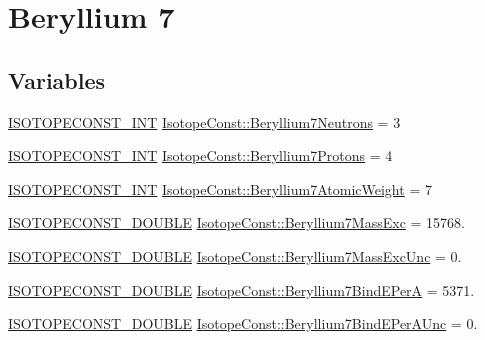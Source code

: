 \hypertarget{group___isotope_const-_beryllium-_be7}{}\section{Beryllium 7}
\label{group___isotope_const-_beryllium-_be7}
\subsection*{Variables}
\begin{DoxyCompactItemize}
\item 
\mbox{\hyperlink{group___isotope_const-_macros_ga5f18360b3e99483a35c32d789e62621c}{I\+S\+O\+T\+O\+P\+E\+C\+O\+N\+S\+T\+\_\+\+I\+NT}} \mbox{\hyperlink{group___isotope_const-_beryllium-_be7_gae3dd52090434b200a4a964110148ff34}{Isotope\+Const\+::\+Beryllium7\+Neutrons}} = 3
\item 
\mbox{\hyperlink{group___isotope_const-_macros_ga5f18360b3e99483a35c32d789e62621c}{I\+S\+O\+T\+O\+P\+E\+C\+O\+N\+S\+T\+\_\+\+I\+NT}} \mbox{\hyperlink{group___isotope_const-_beryllium-_be7_ga08ddc8ad5341c77fc4d43bbd85a62518}{Isotope\+Const\+::\+Beryllium7\+Protons}} = 4
\item 
\mbox{\hyperlink{group___isotope_const-_macros_ga5f18360b3e99483a35c32d789e62621c}{I\+S\+O\+T\+O\+P\+E\+C\+O\+N\+S\+T\+\_\+\+I\+NT}} \mbox{\hyperlink{group___isotope_const-_beryllium-_be7_gab90911ef46c8a519dadec32b1e08a65e}{Isotope\+Const\+::\+Beryllium7\+Atomic\+Weight}} = 7
\item 
\mbox{\hyperlink{group___isotope_const-_macros_ga8f45a7272ce02c0b4c65c44636ed719a}{I\+S\+O\+T\+O\+P\+E\+C\+O\+N\+S\+T\+\_\+\+D\+O\+U\+B\+LE}} \mbox{\hyperlink{group___isotope_const-_beryllium-_be7_ga0feb3ef6650cdb2f90a8374e54b37cda}{Isotope\+Const\+::\+Beryllium7\+Mass\+Exc}} = 15768.
\item 
\mbox{\hyperlink{group___isotope_const-_macros_ga8f45a7272ce02c0b4c65c44636ed719a}{I\+S\+O\+T\+O\+P\+E\+C\+O\+N\+S\+T\+\_\+\+D\+O\+U\+B\+LE}} \mbox{\hyperlink{group___isotope_const-_beryllium-_be7_ga619464651a80e3e304e1083b8d802048}{Isotope\+Const\+::\+Beryllium7\+Mass\+Exc\+Unc}} = 0.
\item 
\mbox{\hyperlink{group___isotope_const-_macros_ga8f45a7272ce02c0b4c65c44636ed719a}{I\+S\+O\+T\+O\+P\+E\+C\+O\+N\+S\+T\+\_\+\+D\+O\+U\+B\+LE}} \mbox{\hyperlink{group___isotope_const-_beryllium-_be7_ga024a7de3f654d55a4bf1eedf1639ea26}{Isotope\+Const\+::\+Beryllium7\+Bind\+E\+PerA}} = 5371.
\item 
\mbox{\hyperlink{group___isotope_const-_macros_ga8f45a7272ce02c0b4c65c44636ed719a}{I\+S\+O\+T\+O\+P\+E\+C\+O\+N\+S\+T\+\_\+\+D\+O\+U\+B\+LE}} \mbox{\hyperlink{group___isotope_const-_beryllium-_be7_ga6c4d779a1e8420da88a29c1bf6e3cc6e}{Isotope\+Const\+::\+Beryllium7\+Bind\+E\+Per\+A\+Unc}} = 0.

\end{DoxyCompactItemize}
